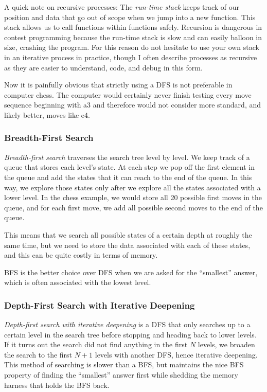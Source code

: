 \documentclass[11pt]{book}
\begin{document}
A quick note on recursive processes: The \textit{run-time stack} keeps track of our position and data that go out of scope when we jump into a new function. This stack allows us to call functions within functions safely. Recursion is dangerous in contest programming because the run-time stack is slow and can easily balloon in size, crashing the program. For this reason do not hesitate to use your own stack in an iterative process in practice, though I often describe processes as recursive as they are easier to understand, code, and debug in this form.

Now it is painfully obvious that strictly using a DFS is not preferable in computer chess. The computer would certainly never finish testing every move sequence beginning with a3 and therefore would not consider more standard, and likely better, moves like e4.

\subsubsection{Breadth-First Search}

\textit{Breadth-first search} traverses the search tree level by level. We keep track of a queue that stores each level's state. At each step we pop off the first element in the queue and add the states that it can reach to the end of the queue. In this way, we explore those states only after we explore all the states associated with a lower level. In the chess example, we would store all 20 possible first moves in the queue, and for each first move, we add all possible second moves to the end of the queue.

This means that we search all possible states of a certain depth at roughly the same time, but we need to store the data associated with each of these states, and this can be quite costly in terms of memory.

BFS is the better choice over DFS when we are asked for the ``smallest'' answer, which is often associated with the lowest level.

\subsubsection{Depth-First Search with Iterative Deepening}

\textit{Depth-first search with iterative deepening} is a DFS that only searches up to a certain level in the search tree before stopping and heading back to lower levels. If it turns out the search did not find anything in the first $N$ levels, we broaden the search to the first $N+1$ levels with another DFS, hence iterative deepening. This method of searching is slower than a BFS, but maintains the nice BFS property of finding the ``smallest'' answer first while shedding the memory harness that holds the BFS back.
\end{document}
